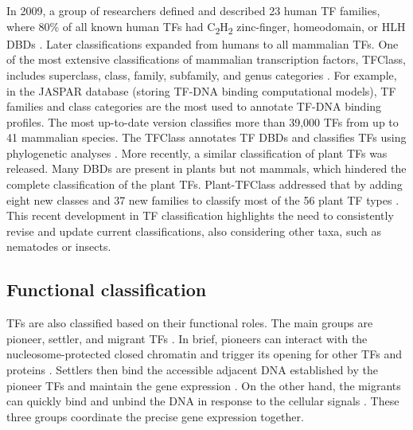     In 2009, a group of researchers defined and described 23 human TF families, where 80\% of all known human TFs had C\textsubscript{2}H\textsubscript{2} zinc-finger, homeodomain, or HLH DBDs \cite{vaquerizas2009census}. Later classifications expanded from humans to all mammalian TFs. One of the most extensive classifications of mammalian transcription factors, TFClass, includes superclass, class, family, subfamily, and genus categories \cite{wingender2018tfclass, wingender2013criteria,wingender2015tfclass,wingender2013tfclass}. For example, in the JASPAR database (storing TF-DNA binding computational models), TF families and class categories are the most used to annotate TF-DNA binding profiles. The most up-to-date version classifies more than 39,000 TFs from up to 41 mammalian species. The TFClass annotates TF DBDs and classifies TFs using phylogenetic analyses \cite{wingender2018tfclass}. More recently, a similar classification of plant TFs was released. Many DBDs are present in plants but not mammals, which hindered the complete classification of the plant TFs. Plant-TFClass addressed that by adding eight new classes and 37 new families to classify most of the 56 plant TF types \cite{blanc2024plant}. This recent development in TF classification highlights the need to consistently revise and update current classifications, also considering other taxa, such as nematodes or insects.

    \subsection{Functional classification}

    TFs are also classified based on their functional roles. The main groups are pioneer, settler, and migrant TFs \cite{ehsani2016feature}. In brief, pioneers can interact with the nucleosome-protected closed chromatin and trigger its opening for other TFs and proteins \cite{barral2023pioneer,long2016ever,ehsani2016feature}. Settlers then bind the accessible adjacent DNA established by the pioneer TFs and maintain the gene expression \cite{sherwood2014discovery,ehsani2016feature}. On the other hand, the migrants can quickly bind and unbind the DNA in response to the cellular signals \cite{ehsani2016feature}. These three groups coordinate the precise gene expression together.

